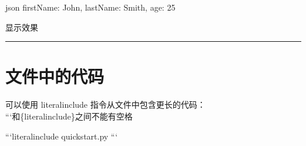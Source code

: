 \documentclass[letterpaper,10pt,english]{sphinxmanual}
\begin{document}
\begin{sphinxVerbatim}[commandchars=\\\{\}]

    \PYGZti{}\PYGZti{}\PYGZti{} json
    \PYGZob{}
        \PYGZdq{}firstName\PYGZdq{}: \PYGZdq{}John\PYGZdq{},
        \PYGZdq{}lastName\PYGZdq{}: \PYGZdq{}Smith\PYGZdq{},
        \PYGZdq{}age\PYGZdq{}: 25
    \PYGZcb{}
    \PYGZti{}\PYGZti{}\PYGZti{}
\end{sphinxVerbatim}

\sphinxAtStartPar
显示效果

\begin{sphinxVerbatim}[commandchars=\\\{\}]
\end{sphinxVerbatim}

\begin{sphinxVerbatim}[commandchars=\\\{\}]
\end{sphinxVerbatim}


\bigskip\hrule\bigskip



\section{文件中的代码}
\label{\detokenize{other/myst_markdown:id13}}
\sphinxAtStartPar
可以使用 literalinclude 指令从文件中包含更长的代码：\\
 ```和\{literalinclude\}之间不能有空格

\begin{sphinxVerbatim}[commandchars=\\\{\}]
    ```\PYGZob{}literalinclude\PYGZcb{} quickstart.py
    ```
\end{sphinxVerbatim}
\end{document}
